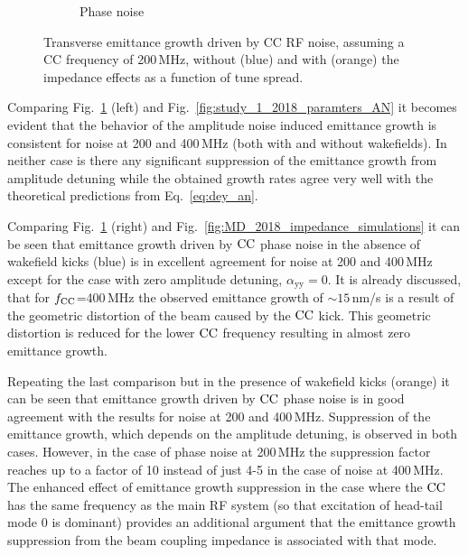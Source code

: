 \begin{figure}[!ht]
\begin{subfigure}[t]{0.45\textwidth}
        \caption{Phase noise}
    \end{subfigure}
    \hfill
     \caption{Transverse emittance growth driven by CC RF noise, assuming a CC frequency of 200\,MHz, without (blue) and with (orange) the impedance effects as a function of tune spread.} %
     \label{fig:CC_200MHz_amplitude_phase_noise}
 \end{figure}

 Comparing Fig.~\ref{fig:CC_200MHz_amplitude_phase_noise} (left) and Fig.~\ref{fig:study_1_2018_paramters_AN} it becomes evident that the behavior of the amplitude noise induced emittance growth is consistent for noise at 200 and 400\,MHz (both with and without wakefields). In neither case is there any significant suppression of the emittance growth from amplitude detuning while the obtained growth rates agree very well with the theoretical predictions from Eq.~\eqref{eq:dey_an}.
 
 Comparing Fig.~\ref{fig:CC_200MHz_amplitude_phase_noise} (right) and Fig.~\ref{fig:MD_2018_impedance_simulations} it can be seen that emittance growth driven by ${\mathrm{CC}}$ phase noise in the absence of wakefield kicks (blue) is in excellent agreement for noise at 200 and 400\,MHz except for the case with zero amplitude detuning, $\alpha_\mathrm{yy}=0$. It is already discussed, that for ${f_\mathrm{CC}}$=400\,MHz the observed emittance growth of $\sim 15$\,nm/s is a result of the geometric distortion of the beam caused by the ${\mathrm{CC}}$ kick. This geometric distortion is reduced for the lower ${\mathrm{CC}}$ frequency resulting in almost zero emittance growth. 

 Repeating the last comparison but in the presence of wakefield kicks (orange) it can be seen that emittance growth driven by ${\mathrm{CC}}$ phase noise is in good agreement with the results for noise at 200 and 400\,MHz. Suppression of the emittance growth, which depends on the amplitude detuning, is observed in both cases. However, in the case of phase noise at 200\,MHz the suppression factor reaches up to a factor of 10 instead of just 4-5 in the case of noise at 400\,MHz. The enhanced effect of emittance growth suppression in the case where the ${\mathrm{CC}}$ has the same frequency as the main RF system (so that excitation of head-tail mode 0 is dominant) provides an additional argument that the emittance growth suppression from the beam coupling impedance is associated with that mode. %



